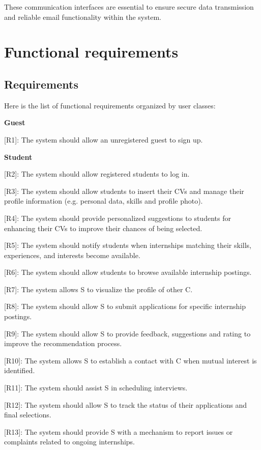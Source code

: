 These communication interfaces are essential to ensure secure data
transmission and reliable email functionality within the system.


\section{Functional requirements}
\label{sec:functional_requirements}%


\subsection{Requirements}
\label{subsec:requirements}%


Here is the list of functional requirements organized by user classes:


\textbf{Guest}

{[}R1{]}: The system should allow an unregistered guest to sign up.

\textbf{Student}

{[}R2{]}: The system should allow registered students to log in.

{[}R3{]}: The system should allow students to insert their CVs and
manage their profile information (e.g. personal data, skills and profile
photo).

{[}R4{]}: The system should provide personalized suggestions to students
for enhancing their CVs to improve their chances of being selected.

{[}R5{]}: The system should notify students when internships matching
their skills, experiences, and interests become available.

{[}R6{]}: The system should allow students to browse available
internship postings.

{[}R7{]}: The system allows S to visualize the profile of other C.

{[}R8{]}: The system should allow S to submit applications for specific
internship postings.

{[}R9{]}: The system should allow S to provide feedback, suggestions and
rating to improve the recommendation process.

{[}R10{]}: The system allows S to establish a contact with C when mutual
interest is identified.

{[}R11{]}: The system should assist S in scheduling interviews.

{[}R12{]}: The system should allow S to track the status of their
applications and final selections.

{[}R13{]}: The system should provide S with a mechanism to report issues
or complaints related to ongoing internships.

